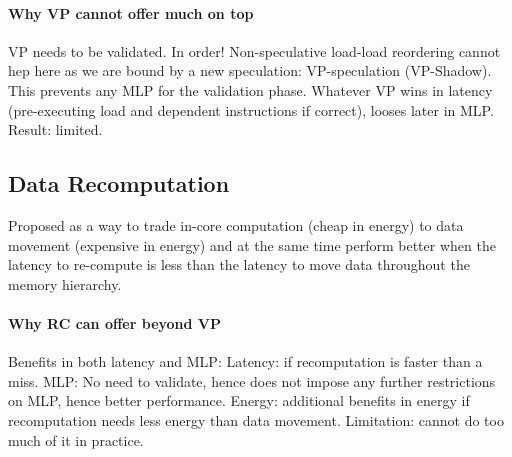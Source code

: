 \paragraph{Why VP cannot offer much on top}
VP needs to be validated. In order! Non-speculative load-load reordering cannot hep here as we are bound by a new speculation: VP-speculation (VP-Shadow). This prevents any MLP for the validation phase. Whatever VP wins in latency (pre-executing load and dependent instructions if correct), looses later in MLP. Result: limited.

\subsection{Data Recomputation}
\label{sec:recmp}
Proposed as a way to trade in-core computation (cheap in energy) to data movement (expensive in energy) and at the same time perform better when the latency to re-compute is less than the latency to move data throughout the memory hierarchy.
\paragraph{Why RC can offer beyond VP}
Benefits in both latency and MLP: Latency: if recomputation is faster than a miss. MLP: No need to validate, hence does not impose any further restrictions on MLP, hence better performance. Energy: additional benefits in energy if recomputation needs less energy than data movement. Limitation: cannot do too much of it in practice.



 